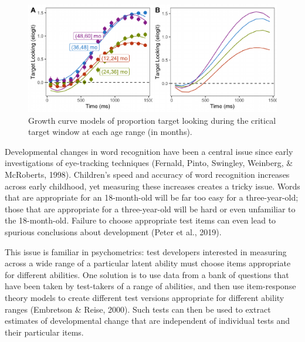 \documentclass[10pt, letterpaper]{article}
\newenvironment{CodeChunk}{}{}
\begin{document}
\begin{CodeChunk}
\begin{figure}[h]

{\centering \includegraphics{figs/age_gca-1} 

}

\caption[Growth curve models of proportion target looking during the critical target window at each age range (in months)]{Growth curve models of proportion target looking during the critical target window at each age range (in months).}\label{fig:age_gca}
\end{figure}
\end{CodeChunk}

Developmental changes in word recognition have been a central issue
since early investigations of eye-tracking techniques (Fernald, Pinto,
Swingley, Weinberg, \& McRoberts, 1998). Children's speed and accuracy
of word recognition increases across early childhood, yet measuring
these increases creates a tricky issue. Words that are appropriate for
an 18-month-old will be far too easy for a three-year-old; those that
are appropriate for a three-year-old will be hard or even unfamiliar to
the 18-month-old. Failure to choose appropriate test items can even lead
to spurious conclusions about development (Peter et al., 2019).

This issue is familiar in psychometrics: test developers interested in
measuring across a wide range of a particular latent ability must choose
items appropriate for different abilities. One solution is to use data
from a bank of questions that have been taken by test-takers of a range
of abilities, and then use item-response theory models to create
different test versions appropriate for different ability ranges
(Embretson \& Reise, 2000). Such tests can then be used to extract
estimates of developmental change that are independent of individual
tests and their particular items.
\end{document}
